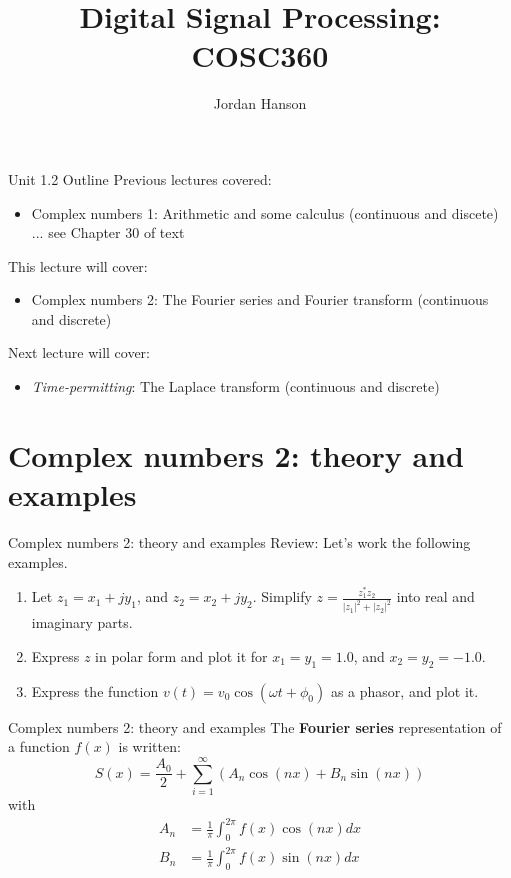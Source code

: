 \documentclass{beamer}
\title{Digital Signal Processing: COSC360}
\author{Jordan Hanson}
\institute{Whittier College Department of Physics and Astronomy}
\begin{document}
\maketitle

\begin{frame}{Unit 1.2 Outline}
Previous lectures covered:
\begin{itemize}
\item Complex numbers 1: Arithmetic and some calculus (continuous and discete) ... see Chapter 30 of text
\end{itemize}
This lecture will cover:
\begin{itemize}
\item \alert{Complex numbers 2: The Fourier series and Fourier transform (continuous and discrete)}
\end{itemize}
Next lecture will cover:
\begin{itemize}
\item \textit{Time-permitting}: The Laplace transform (continuous and discrete)
\end{itemize}
\end{frame}

\section{Complex numbers 2: theory and examples}

\begin{frame}{Complex numbers 2: theory and examples}
Review: Let's work the following examples.
\begin{enumerate}
\item Let $z_1 = x_1 + j y_1$, and $z_2 = x_2 + j y_2$.  Simplify $z = \frac{z_1^* z_2}{|z_1|^2 + |z_2|^2}$ into real and imaginary parts.
\item Express $z$ in polar form and plot it for $x_1 = y_1 = 1.0$, and $x_2 = y_2 = -1.0$.
\item Express the function $v(t) = v_0 \cos(\omega t + \phi_0)$ as a phasor, and plot it.
\end{enumerate}
\end{frame}

\begin{frame}{Complex numbers 2: theory and examples}
The \alert{\textbf{Fourier series}} representation of a function $f(x)$ is written:
\begin{equation}
S(x) = \frac{A_0}{2}+\sum_{i=1}^{\infty} \left( A_n \cos(nx) + B_n \sin(nx) \right)
\end{equation}
with
\begin{align}
A_n &= \frac{1}{\pi} \int_0^{2\pi} f(x) \cos(nx) dx \\
B_n &= \frac{1}{\pi} \int_0^{2\pi} f(x) \sin(nx) dx
\end{align}
\end{frame}
\end{document}
